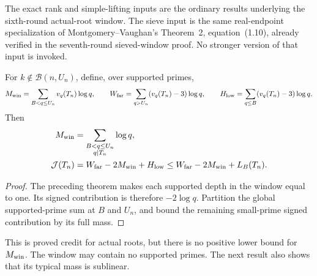 The exact rank and simple-lifting inputs are the ordinary results
underlying the sixth-round actual-root window. The sieve input is
the same real-endpoint specialization of Montgomery--Vaughan's
Theorem~2, equation~(1.10), already verified in the seventh-round
sieved-window proof. No stronger version of that input is invoked.

\begin{lemma}\label{sqw-credit}
For $k\notin\mathcal B(n,U_n)$, define, over supported primes,
\[
 M_{\rm win}=\sum_{B<q\le U_n}v_q(T_n)\log q,\qquad
 W_{\rm far}=\sum_{q>U_n}(v_q(T_n)-3)\log q,\qquad
 H_{\rm low}=\sum_{q\le B}(v_q(T_n)-3)\log q.
\]
Then
\begin{align}
 M_{\rm win}&=\sum_{\substack{B<q\le U_n\\q\mid T_n}}\log q,
 \label{sqw-window-rad}\\
 \mathcal J(T_n)&=W_{\rm far}-2M_{\rm win}+H_{\rm low}
 \le W_{\rm far}-2M_{\rm win}+L_B(T_n).
 \label{sqw-credit-identity}
\end{align}
\end{lemma}
\begin{proof}
The preceding theorem makes each supported depth in the window equal
to one. Its signed contribution is therefore $-2\log q$. Partition
the global supported-prime sum at $B$ and $U_n$, and bound the
remaining small-prime signed contribution by its full mass.
\end{proof}

This is proved credit for actual roots, but there is no positive lower
bound for $M_{\rm win}$. The window may contain no supported primes.
The next result also shows that its typical mass is sublinear.

